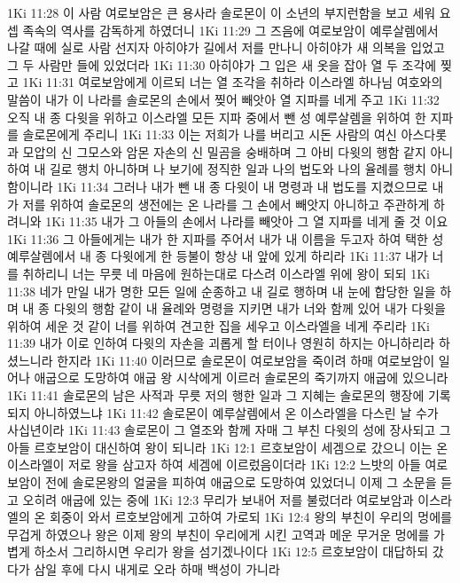 1Ki 11:28  이 사람 여로보암은 큰 용사라 솔로몬이 이 소년의 부지런함을 보고 세워 요셉 족속의 역사를 감독하게 하였더니
1Ki 11:29  그 즈음에 여로보암이 예루살렘에서 나갈 때에 실로 사람 선지자 아히야가 길에서 저를 만나니 아히야가 새 의복을 입었고 그 두 사람만 들에 있었더라
1Ki 11:30  아히야가 그 입은 새 옷을 잡아 열 두 조각에 찢고
1Ki 11:31  여로보암에게 이르되 너는 열 조각을 취하라 이스라엘 하나님 여호와의 말씀이 내가 이 나라를 솔로몬의 손에서 찢어 빼앗아 열 지파를 네게 주고
1Ki 11:32  오직 내 종 다윗을 위하고 이스라엘 모든 지파 중에서 뺀 성 예루살렘을 위하여 한 지파를 솔로몬에게 주리니
1Ki 11:33  이는 저희가 나를 버리고 시돈 사람의 여신 아스다롯과 모압의 신 그모스와 암몬 자손의 신 밀곰을 숭배하며 그 아비 다윗의 행함 같지 아니하여 내 길로 행치 아니하며 나 보기에 정직한 일과 나의 법도와 나의 율례를 행치 아니함이니라
1Ki 11:34  그러나 내가 뺀 내 종 다윗이 내 명령과 내 법도를 지켰으므로 내가 저를 위하여 솔로몬의 생전에는 온 나라를 그 손에서 빼앗지 아니하고 주관하게 하려니와
1Ki 11:35  내가 그 아들의 손에서 나라를 빼앗아 그 열 지파를 네게 줄 것 이요
1Ki 11:36  그 아들에게는 내가 한 지파를 주어서 내가 내 이름을 두고자 하여 택한 성 예루살렘에서 내 종 다윗에게 한 등불이 항상 내 앞에 있게 하리라
1Ki 11:37  내가 너를 취하리니 너는 무릇 네 마음에 원하는대로 다스려 이스라엘 위에 왕이 되되
1Ki 11:38  네가 만일 내가 명한 모든 일에 순종하고 내 길로 행하며 내 눈에 합당한 일을 하며 내 종 다윗의 행함 같이 내 율례와 명령을 지키면 내가 너와 함께 있어 내가 다윗을 위하여 세운 것 같이 너를 위하여 견고한 집을 세우고 이스라엘을 네게 주리라
1Ki 11:39  내가 이로 인하여 다윗의 자손을 괴롭게 할 터이나 영원히 하지는 아니하리라 하셨느니라 한지라
1Ki 11:40  이러므로 솔로몬이 여로보암을 죽이려 하매 여로보암이 일어나 애굽으로 도망하여 애굽 왕 시삭에게 이르러 솔로몬의 죽기까지 애굽에 있으니라
1Ki 11:41  솔로몬의 남은 사적과 무릇 저의 행한 일과 그 지혜는 솔로몬의 행장에 기록되지 아니하였느냐
1Ki 11:42  솔로몬이 예루살렘에서 온 이스라엘을 다스린 날 수가 사십년이라
1Ki 11:43  솔로몬이 그 열조와 함께 자매 그 부친 다윗의 성에 장사되고 그 아들 르호보암이 대신하여 왕이 되니라
1Ki 12:1  르호보암이 세겜으로 갔으니 이는 온 이스라엘이 저로 왕을 삼고자 하여 세겜에 이르렀음이더라
1Ki 12:2  느밧의 아들 여로보암이 전에 솔로몬왕의 얼굴을 피하여 애굽으로 도망하여 있었더니 이제 그 소문을 듣고 오히려 애굽에 있는 중에
1Ki 12:3  무리가 보내어 저를 불렀더라 여로보암과 이스라엘의 온 회중이 와서 르호보암에게 고하여 가로되
1Ki 12:4  왕의 부친이 우리의 멍에를 무겁게 하였으나 왕은 이제 왕의 부친이 우리에게 시킨 고역과 메운 무거운 멍에를 가볍게 하소서 그리하시면 우리가 왕을 섬기겠나이다
1Ki 12:5  르호보암이 대답하되 갔다가 삼일 후에 다시 내게로 오라 하매 백성이 가니라
